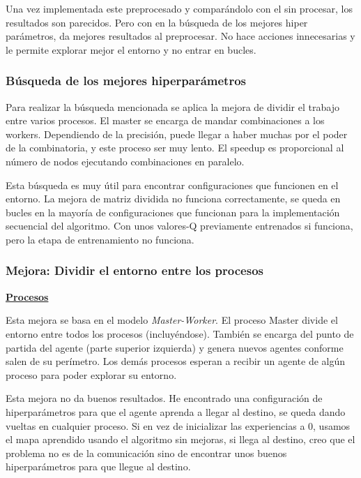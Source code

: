		Una vez implementada este preprocesado y comparándolo con el sin procesar, los resultados son parecidos. Pero con en la búsqueda de los mejores hiper parámetros, da mejores resultados al preprocesar. No hace acciones innecesarias y le permite explorar mejor el entorno y no entrar en bucles.
		
	\subsubsection{Búsqueda de los mejores hiperparámetros}


		Para realizar la búsqueda mencionada se aplica la mejora de dividir el trabajo entre varios procesos. El master se encarga de mandar combinaciones a los workers. Dependiendo de la precisión, puede llegar a haber muchas por el poder de la combinatoria, y este proceso ser muy lento. El speedup es proporcional al número de nodos ejecutando combinaciones en paralelo.
		
		Esta búsqueda es muy útil para encontrar configuraciones que funcionen en el entorno.
		La mejora de matriz dividida no funciona correctamente, se queda en bucles en la mayoría de configuraciones que funcionan para la implementación secuencial del algoritmo. Con unos valores-Q previamente entrenados si funciona, pero la etapa de entrenamiento no funciona.

		
	
	\subsubsection{Mejora: Dividir el entorno entre los procesos}
	
		\begin{flushleft}
		\begin{mdframed}[roundcorner=5pt]		
			\textbf{\underline{Procesos}}
			\vspace{0.1cm}
			
			\scriptsize	
			Esta mejora se basa en el modelo \textit{Master-Worker}. El proceso Master divide el entorno entre todos los procesos (incluyéndose). También se encarga del punto de partida del agente (parte superior izquierda) y genera nuevos agentes conforme salen de su perímetro. Los demás procesos esperan a recibir un agente de algún proceso para poder explorar su entorno.
		\end{mdframed}
		\end{flushleft}	
		
		Esta mejora no da buenos resultados. He encontrado una configuración de hiperparámetros para que el agente aprenda a llegar al destino, se queda dando vueltas en cualquier proceso. Si en vez de inicializar las experiencias a 0, usamos el mapa aprendido usando el algoritmo sin mejoras, si llega al destino, creo que el problema no es de la comunicación sino de encontrar unos buenos hiperparámetros para que llegue al destino.
		
